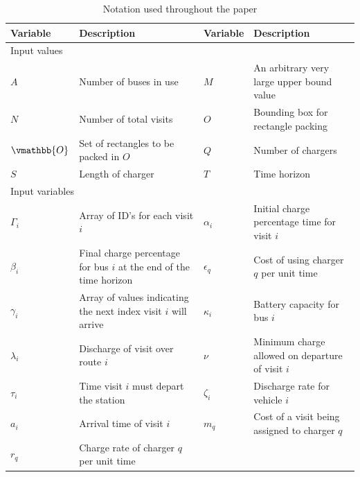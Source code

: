 \documentclass[letterpaper, 10pt, conference]{IEEEtran}
\begin{document}
\begin{table}[!t]
	\caption{Notation used throughout the paper}
	\label{tab:variables}
	\centering
	\begin{tabular}{l l l l}
		\toprule
		\textbf{Variable} & \textbf{Description} & \textbf{Variable} & \textbf{Description} \\
		\toprule
		\multicolumn{4}{l}{Input values}                                  \\
			$A$           & Number of buses in use                    &
			$M$           & An arbitrary very large upper bound value \\
			$N$           & Number of total visits                    &
			$O$           & Bounding box for rectangle packing        \\
			$\vmathbb{O}$ & Set of rectangles to be packed in $O$     &
			$Q$           & Number of chargers                        \\
			$S$           & Length of charger                         &
			$T$           & Time horizon                              \\
		\hline
		\multicolumn{4}{l}{Input variables} \\
			$\Gamma_i$   & Array of ID's for each visit $i$                                   &
			$\alpha_i$   & Initial charge percentage time for visit $i$                       \\
			$\beta_i$    & Final charge percentage for bus $i$ at the end of the time horizon &
			$\epsilon_q$ & Cost of using charger $q$ per unit time                            \\
			$\gamma_i$   & Array of values indicating the next index visit $i$ will arrive    &
			$\kappa_i$   & Battery capacity for bus $i$                                       \\
			$\lambda_i$  & Discharge of visit over route $i$                                  &
			$\nu$        & Minimum charge allowed on departure of visit $i$                   \\
			$\tau_i$     & Time visit $i$ must depart the station                             &
			$\zeta_i$    & Discharge rate for vehicle $i$                                     \\
			$a_i$        & Arrival time of visit  $i$                                         &
			$m_q$        & Cost of a visit being assigned to charger $q$                      \\
			$r_q$        & Charge rate of charger $q$ per unit time                           &

\end{tabular}
\end{table}
\end{document}

